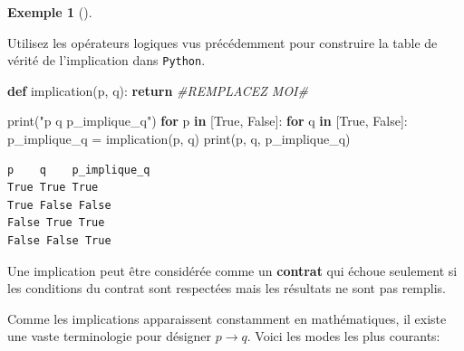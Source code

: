 \documentclass[
  letterpaper,
]{scrbook}
\newenvironment{Shaded}{}{}
\newcommand{\BuiltInTok}[1]{#1}
\newcommand{\CommentTok}[1]{\textcolor[rgb]{0.38,0.63,0.69}{\textit{#1}}}
\newcommand{\ControlFlowTok}[1]{\textcolor[rgb]{0.00,0.44,0.13}{\textbf{#1}}}
\newcommand{\KeywordTok}[1]{\textcolor[rgb]{0.00,0.44,0.13}{\textbf{#1}}}
\newcommand{\NormalTok}[1]{#1}
\newcommand{\OperatorTok}[1]{\textcolor[rgb]{0.40,0.40,0.40}{#1}}
\newcommand{\StringTok}[1]{\textcolor[rgb]{0.25,0.44,0.63}{#1}}
\newcommand{\VariableTok}[1]{\textcolor[rgb]{0.10,0.09,0.49}{#1}}
\theoremstyle{plain}
\theoremstyle{definition}
\newtheorem{example}{Exemple}[chapter]
\theoremstyle{definition}
\theoremstyle{remark}
\begin{document}
\leavevmode{}%
\begin{example}[]\label{exm-implication-python}

Utilisez les opérateurs logiques vus précédemment pour construire la
table de vérité de l'implication dans \texttt{Python}.

\hypertarget{implication-python-todo}{}
\begin{Shaded}
\begin{Highlighting}[]
\KeywordTok{def}\NormalTok{ implication(p, q):}
    \ControlFlowTok{return} \CommentTok{\#REMPLACEZ MOI\#}

\BuiltInTok{print}\NormalTok{(}\StringTok{"p    q    p\_implique\_q"}\NormalTok{)}
\ControlFlowTok{for}\NormalTok{ p }\KeywordTok{in}\NormalTok{ [}\VariableTok{True}\NormalTok{, }\VariableTok{False}\NormalTok{]:}
    \ControlFlowTok{for}\NormalTok{ q }\KeywordTok{in}\NormalTok{ [}\VariableTok{True}\NormalTok{, }\VariableTok{False}\NormalTok{]:}
\NormalTok{        p\_implique\_q }\OperatorTok{=}\NormalTok{ implication(p, q)}
        \BuiltInTok{print}\NormalTok{(p, q, p\_implique\_q)}
\end{Highlighting}
\end{Shaded}

\hypertarget{implication-python}{}
\begin{verbatim}
p    q    p_implique_q
True True True
True False False
False True True
False False True
\end{verbatim}

\end{example}

\begin{tcolorbox}[enhanced jigsaw, opacityback=0, rightrule=.15mm, breakable, toprule=.15mm, colbacktitle=quarto-callout-important-color!10!white, title=\textcolor{quarto-callout-important-color}{\faExclamation}\hspace{0.5em}{Important}, titlerule=0mm, arc=.35mm, colback=white, coltitle=black, colframe=quarto-callout-important-color-frame, bottomtitle=1mm, toptitle=1mm, bottomrule=.15mm, leftrule=.75mm, left=2mm, opacitybacktitle=0.6]

Une implication peut être considérée comme un \textbf{contrat} qui
échoue seulement si les conditions du contrat sont respectées mais les
résultats ne sont pas remplis.

\end{tcolorbox}

Comme les implications apparaissent constamment en mathématiques, il
existe une vaste terminologie pour désigner \(p\rightarrow q\). Voici
les modes les plus courants:
\end{document}
